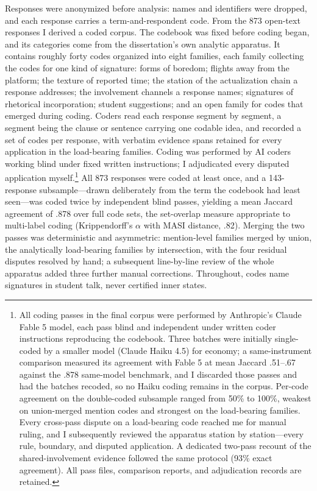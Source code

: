 Responses were anonymized before analysis: names and identifiers were dropped,
and each response carries a term-and-respondent code. From the 873 open-text
responses I derived a coded corpus. The codebook was fixed before coding
began, and its categories come from the dissertation's own analytic
apparatus. It contains roughly forty codes organized into eight families,
each family collecting the codes for one kind of signature: forms of boredom;
flights away from the platform; the texture of reported time; the station of
the actualization chain a response addresses; the involvement channels a
response names; signatures of rhetorical incorporation; student suggestions;
and an open family for codes that emerged during coding. Coders read
each response segment by segment, a segment being the clause or sentence
carrying one codable idea, and recorded a set of codes per response, with
verbatim evidence spans retained for every application in the load-bearing
families. Coding was performed by AI coders working blind under fixed written
instructions; I adjudicated every disputed application myself.\footnote{All
coding passes in the final corpus were performed by Anthropic's Claude Fable 5
model, each pass blind and independent under written coder instructions
reproducing the codebook. Three batches were initially single-coded by a
smaller model (Claude Haiku 4.5) for economy; a same-instrument comparison
measured its agreement with Fable 5 at mean Jaccard .51--.67 against the .878
same-model benchmark, and I discarded those passes and had the batches
recoded, so no Haiku coding remains in the corpus. Per-code agreement on the
double-coded subsample ranged from 50\% to 100\%, weakest on union-merged
mention codes and strongest on the load-bearing families. Every cross-pass
dispute on a load-bearing code reached me for manual ruling, and I
subsequently reviewed the apparatus station by station---every rule, boundary,
and disputed application. A dedicated two-pass recount of the
shared-involvement evidence followed the same protocol (93\% exact agreement).
All pass files, comparison reports, and adjudication records are retained.}
All 873 responses were coded at least once, and a 143-response
subsample---drawn deliberately from the term the codebook had least seen---was
coded twice by independent blind passes, yielding a mean Jaccard agreement of
.878 over full code sets, the set-overlap measure appropriate to multi-label
coding (Krippendorff's $\alpha$ with MASI distance, .82). Merging the two
passes was deterministic and asymmetric: mention-level families merged by
union, the analytically load-bearing families by intersection, with the four
residual disputes resolved by hand; a subsequent line-by-line review of the
whole apparatus added three further manual corrections. Throughout, codes name
signatures in student talk, never certified inner states.

